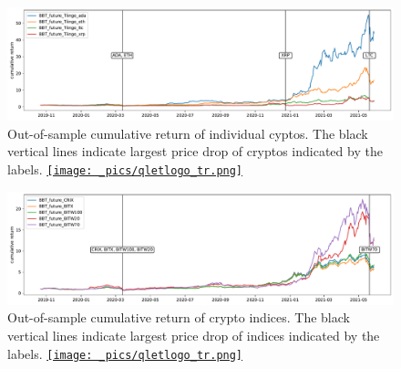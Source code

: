 \begin{figure}[t]
\includegraphics[width=\textwidth]{_pics/individualCoins_price.pdf}
  \caption{Out-of-sample cumulative return of individual cyptos.
  The black vertical lines indicate largest price drop of cryptos indicated by the labels.
  \href{http://www.quantlet.com/}{\texttt{[image: \_pics/qletlogo\_tr.png]}} }
\label{fig:individualCoins_price}
\end{figure}

\begin{figure}[t]
\includegraphics[width=\textwidth]{_pics/index_price.pdf}
  \caption{Out-of-sample cumulative return of crypto indices.
  The black vertical lines indicate largest price drop of indices indicated by the labels.
  \href{http://www.quantlet.com/}{\texttt{[image: \_pics/qletlogo\_tr.png]}} }
\label{fig:index_price}
\end{figure}

